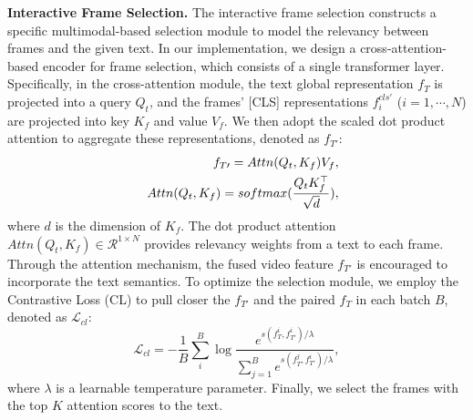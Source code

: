 \documentclass[11pt]{article}
\begin{document}
\textbf{Interactive Frame Selection.}
The interactive frame selection constructs a specific multimodal-based selection module to model the relevancy between frames and the given text.
In our implementation, we design a cross-attention-based encoder for frame selection, which consists of a single transformer layer.
Specifically, in the cross-attention module, the text global representation $f_T$ is projected into a query $Q_t$, and the frames' [CLS] representations $f^{cls\prime}_i$ ($i=1, \cdots, N$) are projected into key $K_f$ and value $V_f$. 
We then adopt the scaled dot product attention to aggregate these representations, denoted as $f_{T\prime}$:
\begin{eqnarray}
    &&f_{T\prime} = Attn(Q_t, K_f)  V_f, \\
    &&Attn(Q_t, K_f) = softmax(\frac{Q_t K_f^\top}{\sqrt{d}}),  
    \vspace{-0.5cm}
\end{eqnarray}
where $d$ is the dimension of $K_f$.
The dot product attention $Attn(Q_t, K_f) \in \mathcal{R}^{1 \times N}$ provides relevancy weights from a text to each frame.
Through the attention mechanism, the fused video feature $f_{T\prime}$ is encouraged to incorporate the text semantics.
To optimize the selection module, we employ the Contrastive Loss (CL) to pull closer the $f_{T\prime}$ and the paired $f_{T}$ in each batch $B$, denoted as $\mathcal{L}_{cl}$:
\begin{equation}
    \mathcal{L}_{cl} = -\frac{1}{B} \sum_i^B \log \frac{e^{s(f^i_T,f^i_{T\prime})/\lambda}}{\sum\nolimits_{j=1}^B e^{s(f^j_T,f^i_{T\prime})/\lambda}},
\end{equation}
where $\lambda$ is a learnable temperature parameter.
Finally, we select the frames with the top $K$ attention scores to the text.
\end{document}
